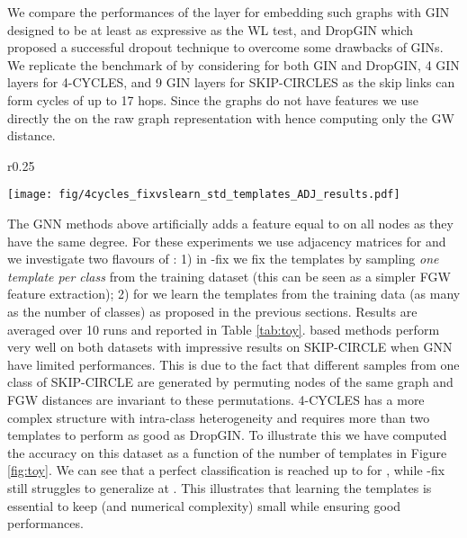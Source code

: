 \documentclass{article}
\begin{document}
We compare the performances of the  layer for embedding such graphs with GIN \cite{xu2018powerful} designed to be at least as expressive
as the WL test, and DropGIN \cite{papp2021dropgnn} which proposed a successful dropout technique to overcome some drawbacks of GINs.
We replicate the benchmark
of \cite{papp2021dropgnn} by considering 
for both GIN and DropGIN, 4 GIN layers for 4-CYCLES, and 9 GIN
layers for SKIP-CIRCLES as the skip links can form cycles of up to 17 hops. Since the graphs do not have features we use
directly the  on the raw graph representation with  hence computing
only the GW distance.\begin{wrapfigure}{r}{0.25\textwidth}  \vspace{-5mm}
	\begin{center}
		\texttt{[image: fig/4cycles\_fixvslearn\_std\_templates\_ADJ\_results.pdf]}
	\end{center}
	\vspace{-4mm}
	\caption{\label{fig:toy}Test accuracy distributions by number of templates either fixed or learned.} 
\end{wrapfigure} The GNN methods above artificially adds a feature equal to  on all nodes as they have the same degree. For these experiments we use adjacency
matrices for  and we investigate two flavours of : 1) in -fix we fix the
templates by sampling \emph{one template per class} from the training dataset (this can be seen as a simpler FGW feature extraction);
2) for  we learn the templates from the training
data (as many as the number of classes) as proposed in the previous sections. Results are averaged over 10 runs and reported in
Table \ref{tab:toy}.  based methods perform very well on both datasets with
impressive results on SKIP-CIRCLE when GNN have limited performances. This is due to the fact that different samples from one class of SKIP-CIRCLE are generated by permuting nodes of the same graph and FGW distances are invariant to these permutations.
4-CYCLES has a more complex structure with intra-class
heterogeneity and requires more than two templates to perform as good as DropGIN. To illustrate this we have computed the accuracy on this dataset as a
function of the number of templates  in Figure \ref{fig:toy}. We can see that a perfect
classification is reached up to  for , while -fix still
struggles to generalize at . This illustrates that
learning the templates is essential to keep  (and numerical complexity) small
while ensuring good performances. 
\end{document}
